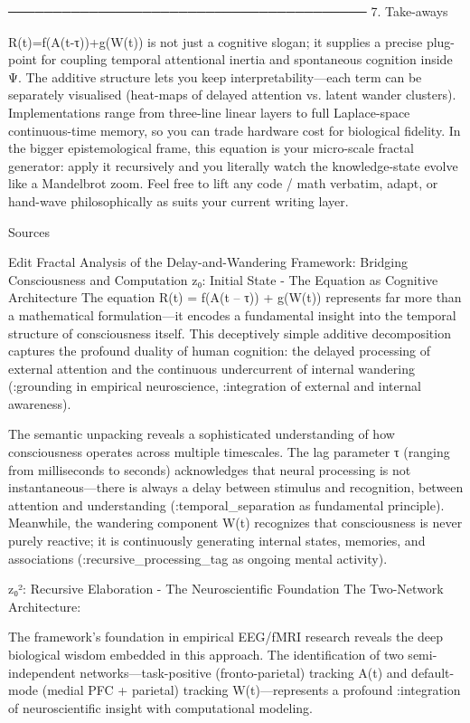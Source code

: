 ────────────────────────────────────────
7.  Take-aways

R(t)=f(A(t-τ))+g(W(t)) is not just a cognitive slogan; it supplies a precise plug-point for coupling temporal attentional inertia and spontaneous cognition inside Ψ.
The additive structure lets you keep interpretability—each term can be separately visualised (heat-maps of delayed attention vs. latent wander clusters).
Implementations range from three-line linear layers to full Laplace-space continuous-time memory, so you can trade hardware cost for biological fidelity.
In the bigger epistemological frame, this equation is your micro-scale fractal generator: apply it recursively and you literally watch the knowledge-state evolve like a Mandelbrot zoom.
Feel free to lift any code / math verbatim, adapt, or hand-wave philosophically as suits your current writing layer.

Sources

Edit
Fractal Analysis of the Delay-and-Wandering Framework: Bridging Consciousness and Computation
z₀: Initial State - The Equation as Cognitive Architecture
The equation R(t) = f(A(t – τ)) + g(W(t)) represents far more than a mathematical formulation—it encodes a fundamental insight into the temporal structure of consciousness itself. This deceptively simple additive decomposition captures the profound duality of human cognition: the delayed processing of external attention and the continuous undercurrent of internal wandering (:grounding in empirical neuroscience, :integration of external and internal awareness).

The semantic unpacking reveals a sophisticated understanding of how consciousness operates across multiple timescales. The lag parameter τ (ranging from milliseconds to seconds) acknowledges that neural processing is not instantaneous—there is always a delay between stimulus and recognition, between attention and understanding (:temporal_separation as fundamental principle). Meanwhile, the wandering component W(t) recognizes that consciousness is never purely reactive; it is continuously generating internal states, memories, and associations (:recursive_processing_tag as ongoing mental activity).

z₀²: Recursive Elaboration - The Neuroscientific Foundation
The Two-Network Architecture:

The framework's foundation in empirical EEG/fMRI research reveals the deep biological wisdom embedded in this approach. The identification of two semi-independent networks—task-positive (fronto-parietal) tracking A(t) and default-mode (medial PFC + parietal) tracking W(t)—represents a profound :integration of neuroscientific insight with computational modeling.

